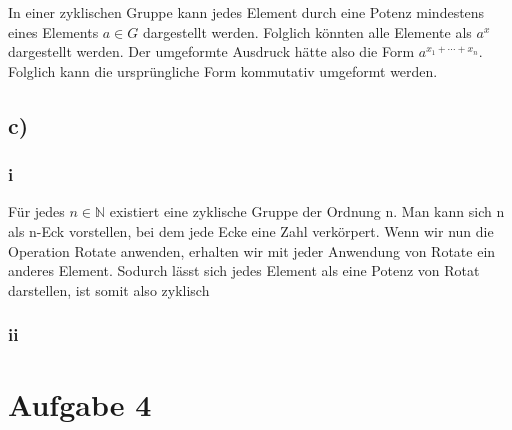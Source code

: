 \documentclass{article}
\begin{document}
	In einer zyklischen Gruppe kann jedes Element durch eine Potenz mindestens eines Elements $ a \in G $ dargestellt werden. Folglich könnten alle Elemente als $a^x$ dargestellt werden. 
	Der umgeformte Ausdruck hätte also die Form $a^{x_1+\cdots +x_{n}}$. Folglich kann die ursprüngliche Form kommutativ umgeformt werden.

	\subsection*{c)}

		 \subsubsection*{i}

		 	Für jedes $n \in \mathbb{N}$ existiert eine zyklische Gruppe der Ordnung n. 
		 	Man kann sich n als n-Eck vorstellen, bei dem jede Ecke eine Zahl verkörpert. Wenn wir nun die Operation Rotate anwenden, erhalten wir mit jeder Anwendung von Rotate ein anderes Element. Sodurch lässt sich jedes Element als eine Potenz von Rotat darstellen, ist somit also zyklisch
		 
		 \subsubsection*{ii}

		 
		 

\section*{Aufgabe 4}
\end{document}
